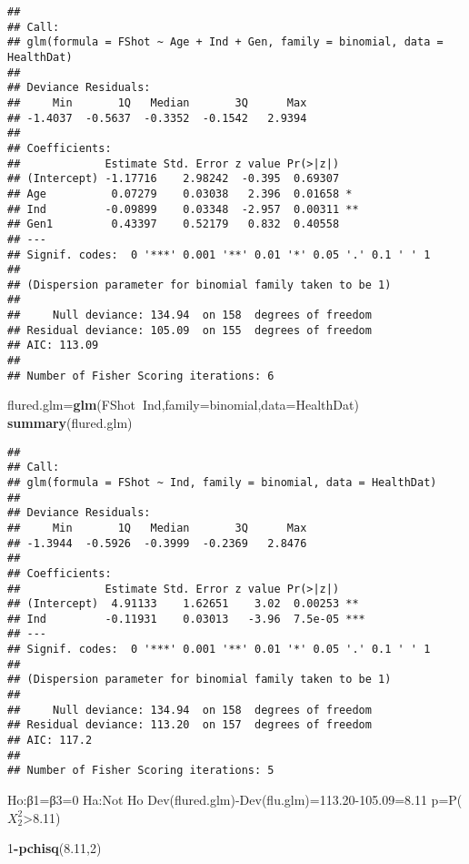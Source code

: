 \documentclass[]{article}
\newenvironment{Shaded}{\begin{snugshade}}{\end{snugshade}}
\newcommand{\KeywordTok}[1]{\textcolor[rgb]{0.13,0.29,0.53}{\textbf{#1}}}
\newcommand{\DataTypeTok}[1]{\textcolor[rgb]{0.13,0.29,0.53}{#1}}
\newcommand{\DecValTok}[1]{\textcolor[rgb]{0.00,0.00,0.81}{#1}}
\newcommand{\FloatTok}[1]{\textcolor[rgb]{0.00,0.00,0.81}{#1}}
\newcommand{\OperatorTok}[1]{\textcolor[rgb]{0.81,0.36,0.00}{\textbf{#1}}}
\newcommand{\NormalTok}[1]{#1}
\begin{document}
\begin{verbatim}
## 
## Call:
## glm(formula = FShot ~ Age + Ind + Gen, family = binomial, data = HealthDat)
## 
## Deviance Residuals: 
##     Min       1Q   Median       3Q      Max  
## -1.4037  -0.5637  -0.3352  -0.1542   2.9394  
## 
## Coefficients:
##             Estimate Std. Error z value Pr(>|z|)   
## (Intercept) -1.17716    2.98242  -0.395  0.69307   
## Age          0.07279    0.03038   2.396  0.01658 * 
## Ind         -0.09899    0.03348  -2.957  0.00311 **
## Gen1         0.43397    0.52179   0.832  0.40558   
## ---
## Signif. codes:  0 '***' 0.001 '**' 0.01 '*' 0.05 '.' 0.1 ' ' 1
## 
## (Dispersion parameter for binomial family taken to be 1)
## 
##     Null deviance: 134.94  on 158  degrees of freedom
## Residual deviance: 105.09  on 155  degrees of freedom
## AIC: 113.09
## 
## Number of Fisher Scoring iterations: 6
\end{verbatim}

\begin{Shaded}
\begin{Highlighting}[]
\NormalTok{flured.glm=}\KeywordTok{glm}\NormalTok{(FShot}\OperatorTok{~}\NormalTok{Ind,}\DataTypeTok{family=}\NormalTok{binomial,}\DataTypeTok{data=}\NormalTok{HealthDat)}
\KeywordTok{summary}\NormalTok{(flured.glm)}
\end{Highlighting}
\end{Shaded}

\begin{verbatim}
## 
## Call:
## glm(formula = FShot ~ Ind, family = binomial, data = HealthDat)
## 
## Deviance Residuals: 
##     Min       1Q   Median       3Q      Max  
## -1.3944  -0.5926  -0.3999  -0.2369   2.8476  
## 
## Coefficients:
##             Estimate Std. Error z value Pr(>|z|)    
## (Intercept)  4.91133    1.62651    3.02  0.00253 ** 
## Ind         -0.11931    0.03013   -3.96  7.5e-05 ***
## ---
## Signif. codes:  0 '***' 0.001 '**' 0.01 '*' 0.05 '.' 0.1 ' ' 1
## 
## (Dispersion parameter for binomial family taken to be 1)
## 
##     Null deviance: 134.94  on 158  degrees of freedom
## Residual deviance: 113.20  on 157  degrees of freedom
## AIC: 117.2
## 
## Number of Fisher Scoring iterations: 5
\end{verbatim}

Ho:β1=β3=0 Ha:Not Ho Dev(flured.glm)-Dev(flu.glm)=113.20-105.09=8.11
p=P(\(X^2_2\)\textgreater{}8.11)

\begin{Shaded}
\begin{Highlighting}[]
\DecValTok{1}\OperatorTok{-}\KeywordTok{pchisq}\NormalTok{(}\FloatTok{8.11}\NormalTok{,}\DecValTok{2}\NormalTok{)}
\end{Highlighting}
\end{Shaded}
\end{document}
